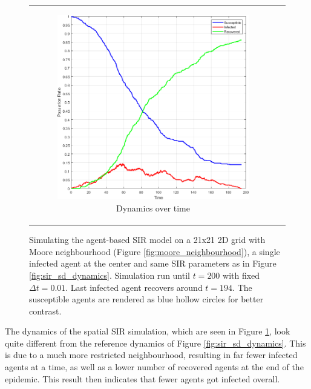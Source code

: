 \begin{figure}
\begin{center}
\begin{tabular}{c c}
		\begin{subfigure}[b]{0.43\textwidth}
			\centering
			\includegraphics[width=1\textwidth, angle=0]{./fig/timedriven/SIR_Dunai/SIR_Dunai_dt001.png}
			\caption{Dynamics over time}
			\label{fig:sir_dunai_env_dynamics}
		\end{subfigure}
	\end{tabular}
	
	\caption[Simulating the agent-based SIR model on a 21x21 2D grid with Moore neighbourhood]{Simulating the agent-based SIR model on a 21x21 2D grid with Moore neighbourhood (Figure \ref{fig:moore_neighbourhood}), a single infected agent at the center and same SIR parameters as in Figure \ref{fig:sir_sd_dynamics}. Simulation run until $t = 200$ with fixed $\Delta t = 0.01$. Last infected agent recovers around $t = 194$. The susceptible agents are rendered as blue hollow circles for better contrast.}
	\label{fig:sir_dunai}
\end{center}
\end{figure}

The dynamics of the spatial SIR simulation, which are seen in Figure \ref{fig:sir_dunai_env_dynamics}, look quite different from the reference dynamics of Figure \ref{fig:sir_sd_dynamics}. This is due to a much more restricted neighbourhood, resulting in far fewer infected agents at a time, as well as a lower number of recovered agents at the end of the epidemic. This result then indicates that fewer agents got infected overall.

